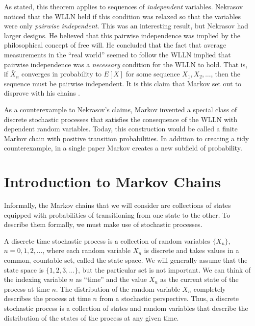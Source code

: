 \documentclass[12pt]{article}
\theoremstyle{definition}
\begin{document}
As stated, this theorem applies to sequences of \emph{independent} variables.
Nekrasov noticed that the WLLN held if this condition was relaxed so that the
variables were only \emph{pairwise independent}. This was an interesting
result, but Nekrasov had larger designs. He believed that this pairwise
independence was implied by the philosophical concept of free will. He
concluded that the fact that average measurements in the ``real world'' seemed
to follow the WLLN implied that pairwise independence was a \emph{necessary}
condition for the WLLN to hold. That is, if $\bar{X}_n$ converges in
probability to $E[X]$ for some sequence $X_1, X_2, \dots$, then the sequence
must be pairwise independent. It is this claim that Markov set out to disprove
with his chains \citep{seneta1996markov}.


As a counterexample to Nekrasov's claims, Markov invented a special class of
discrete stochastic processes that satisfies the consequence of the WLLN with
dependent random variables. Today, this construction would be called a finite
Markov chain with positive transition probabilities. In addition to creating a
tidy counterexample, in a single paper Markov creates a new subfield of
probability.

\section{Introduction to Markov Chains}
\label{sec:introduction_to_markov_chains}

Informally, the Markov chains that we will consider are collections of states
equipped with probabilities of transitioning from one state to the other. To
describe them formally, we must make use of stochastic processes.

A discrete time stochastic process is a collection of random variables
$\{X_n\}$, $n = 0, 1, 2, \dots$, where each random variable $X_n$ is discrete
and takes values in a common, countable set, called the state space. We will
generally assume that the state space is $\{1, 2, 3, \dots\}$, but the
particular set is not important. We can think of the indexing variable $n$ as
``time'' and the value $X_n$ as the current state of the process at time $n$.
The distribution of the random variable $X_n$ completely describes the process
at time $n$ from a stochastic perspective. Thus, a discrete stochastic process
is a collection of states and random variables that describe the distribution
of the states of the process at any given time.
\end{document}
